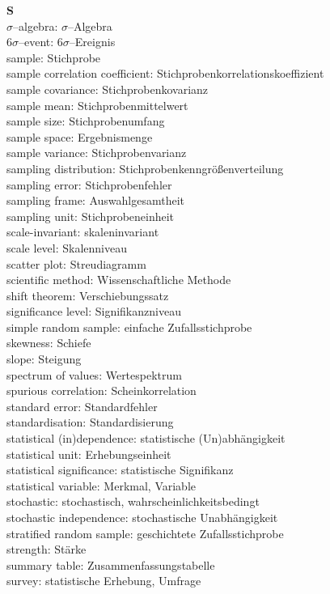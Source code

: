 \medskip
\noindent
{\bf S}\\
$\sigma$--algebra: $\sigma$--Algebra\\
$6\sigma$--event: $6\sigma$--Ereignis\\
sample: Stichprobe\\
sample correlation coefficient: 
Stichprobenkorrelationskoeffizient\\
sample covariance: Stichprobenkovarianz\\
sample mean: Stichprobenmittelwert\\
sample size: Stichprobenumfang\\
sample space: Ergebnismenge\\
sample variance: Stichprobenvarianz\\
sampling distribution: Stichprobenkenngr\"{o}\ss enverteilung\\
sampling error: Stichprobenfehler\\
sampling frame: Auswahlgesamtheit\\
sampling unit: Stichprobeneinheit\\
scale-invariant: skaleninvariant\\
scale level: Skalenniveau\\
scatter plot: Streudiagramm\\
scientific method: Wissenschaftliche Methode\\
shift theorem: Verschiebungssatz\\
significance level: Signifikanzniveau\\
simple random sample: einfache Zufallsstichprobe\\
skewness: Schiefe\\
slope: Steigung\\
spectrum of values: Wertespektrum\\
spurious correlation: Scheinkorrelation\\
standard error: Standardfehler\\
standardisation: Standardisierung\\
statistical (in)dependence: statistische (Un)abh\"{a}ngigkeit\\
statistical unit: Erhebungseinheit\\
statistical significance: statistische Signifikanz\\
statistical variable: Merkmal, Variable\\
stochastic: stochastisch, wahrscheinlichkeitsbedingt\\
stochastic independence: stochastische Unabh\"{a}ngigkeit\\
stratified random sample: geschichtete Zufallsstichprobe\\
strength: St\"{a}rke\\
summary table: Zusammenfassungstabelle\\
survey: statistische Erhebung, Umfrage

